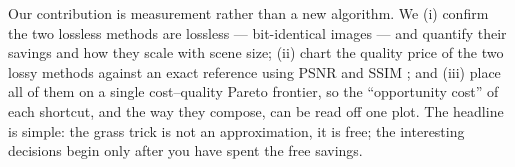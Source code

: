 Our contribution is measurement rather than a new algorithm. We (i) confirm the
two lossless methods are lossless --- bit-identical images --- and quantify their
savings and how they scale with scene size; (ii) chart the quality price of the
two lossy methods against an exact reference using PSNR and SSIM
\cite{wang2004image}; and (iii) place all of them on a single cost--quality
Pareto frontier, so the ``opportunity cost'' of each shortcut, and the way they
compose, can be read off one plot. The headline is simple: the grass trick is
not an approximation, it is free; the interesting decisions begin only after you
have spent the free savings.
